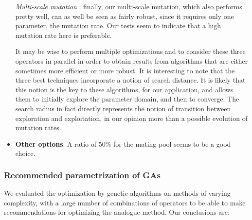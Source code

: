 \documentclass[twocol]{ametsoc}
\begin{document}
\begin{itemize}
	\textit{Multi-scale mutation} \citep{Horton2012a}: finally, our multi-scale mutation, which also performs pretty well, can as well be seen as fairly robust, since it requires only one parameter, the mutation rate. Our tests seem to indicate that a high mutation rate here is preferable.
	
	It may be wise to perform multiple optimizations and to consider these three operators in parallel in order to obtain results from algorithms that are either sometimes more efficient or more robust. It is interesting to note that the three best techniques incorporate a notion of search distance. It is likely that this notion is the key to these algorithms, for our application, and allows them to initially explore the parameter domain, and then to converge. The search radius in fact directly represents the notion of transition between exploration and exploitation, in our opinion more than a possible evolution of mutation rates.
	
	\item \textbf{Other options}: A ratio of 50\% for the mating pool seems to be a good choice.
	
\end{itemize}


\subsubsection{Recommended parametrization of GAs}

We evaluated the optimization by genetic algorithms on methods of varying complexity, with a large number of combinations of operators to be able to make recommendations for optimizing the analogue method. Our conclusions are:
\end{document}
